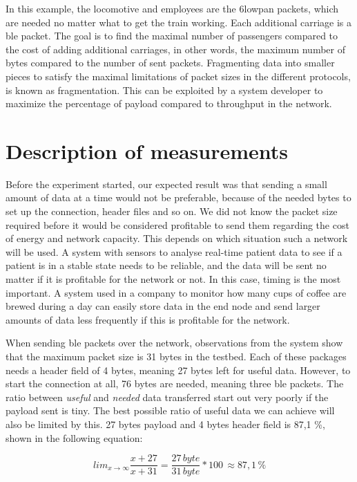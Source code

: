 \noindent In this example, the locomotive and employees are the \gls{6lowpan} packets, which are needed no matter what to get the train working. Each additional carriage is a \gls{ble} packet. The goal is to find the maximal number of passengers compared to the cost of adding additional carriages, in other words, the maximum number of bytes compared to the number of sent packets. Fragmenting data into smaller pieces to satisfy the maximal limitations of packet sizes in the different protocols, is known as fragmentation. This can be exploited by a system developer to maximize the percentage of \gls{payload} compared to \gls{throughput} in the network.


\section{Description of measurements}

\noindent Before the experiment started, our expected result was that sending a small amount of data at a time would not be preferable, because of the needed bytes to set up the connection, header files and so on. We did not know the packet size required before it would be considered profitable to send them regarding the cost of energy and network capacity. This depends on which situation such a network will be used. A system with sensors to analyse real-time patient data to see if a patient is in a stable state needs to be reliable, and the data will be sent no matter if it is profitable for the network or not. In this case, timing is the most important. A system used in a company to monitor how many cups of coffee are brewed during a day can easily store data in the end node and send larger amounts of data less frequently if this is profitable for the network. 

\noindent When sending \gls{ble} packets over the network, observations from the system show that the maximum packet size is 31 bytes in the testbed. Each of these packages needs a header field of 4 bytes, meaning 27 bytes left for useful data. However, to start the connection at all, 76 bytes are needed, meaning three \gls{ble} packets. The ratio between \textit{useful} and \textit{needed} data transferred start out very poorly if the payload sent is tiny. The best possible ratio of useful data we can achieve will also be limited by this. 27 bytes \gls{payload} and 4 bytes header field is 87,1 \%, shown in the following equation: 

\begin{equation} \label{percentageHeader}
    lim_{x\to\infty} \frac{x + 27}{x + 31} = \frac{27 \, byte}{31 \, byte}*100 \, \approx 87,1 \,\%
\end{equation} 

